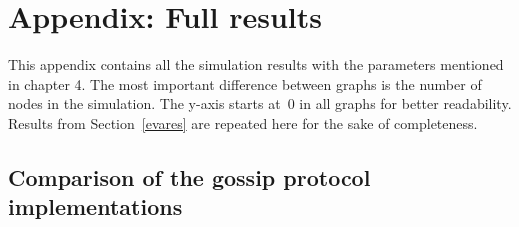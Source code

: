 \section{Appendix: Full results}
\label{axresults}

This appendix contains all the simulation results with the parameters mentioned in chapter 4.
The most important difference between graphs is the number of nodes in the simulation.
The y-axis starts at~0 in all graphs for better readability.
Results from Section~\ref{evares} are repeated here for the sake of completeness.


\subsection*{Comparison of the gossip protocol implementations }

